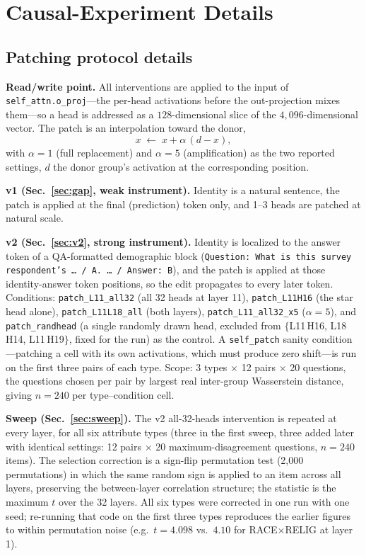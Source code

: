 \section{Causal-Experiment Details}

\subsection{Patching protocol details}
\label{app:patching}
\textbf{Read/write point.} All interventions are applied to the input of
\texttt{self\_attn.o\_proj}---the per-head activations before the
out-projection mixes them---so a head is addressed as a $128$-dimensional
slice of the $4{,}096$-dimensional vector. The patch is an interpolation
toward the donor,
\begin{equation}
x \;\leftarrow\; x + \alpha\,(d - x),
\end{equation}
with $\alpha=1$ (full replacement) and $\alpha=5$ (amplification) as the
two reported settings, $d$ the donor group's activation at the
corresponding position.

\textbf{v1 (Sec.~\ref{sec:gap}, weak instrument).} Identity is a natural
sentence, the patch is applied at the final (prediction) token only, and
1--3 heads are patched at natural scale.

\textbf{v2 (Sec.~\ref{sec:v2}, strong instrument).} Identity is localized
to the answer token of a QA-formatted demographic block
(\texttt{Question: What is this survey respondent's \dots{} / A. \dots{} /
Answer: B}), and the patch is applied at those identity-answer token
positions, so the edit propagates to every later token. Conditions:
\texttt{patch\_L11\_all32} (all 32 heads at layer 11),
\texttt{patch\_L11H16} (the star head alone),
\texttt{patch\_L11L18\_all} (both layers), \texttt{patch\_L11\_all32\_x5}
($\alpha=5$), and \texttt{patch\_randhead} (a single randomly drawn head,
excluded from $\{$L11\,H16, L18\,H14, L11\,H19$\}$, fixed for the run) as
the control. A \texttt{self\_patch} sanity condition---patching a cell
with its own activations, which must produce zero shift---is run on the
first three pairs of each type. Scope: 3 types $\times$ 12 pairs $\times$
20 questions, the questions chosen per pair by largest real inter-group
Wasserstein distance, giving $n=240$ per type--condition cell.

\textbf{Sweep (Sec.~\ref{sec:sweep}).} The v2 all-32-heads intervention is
repeated at every layer, for all six attribute types (three in the first
sweep, three added later with identical settings: 12 pairs $\times$ 20
maximum-disagreement questions, $n=240$ items). The selection correction
is a sign-flip permutation test (2{,}000 permutations) in which the same
random sign is applied to an item across all layers, preserving the
between-layer correlation structure; the statistic is the maximum $t$ over
the 32 layers. All six types were corrected in one run with one seed;
re-running that code on the first three types reproduces the earlier
figures to within permutation noise (e.g.\ $t=4.098$ vs.\ $4.10$ for
RACE$\times$RELIG at layer 1).

